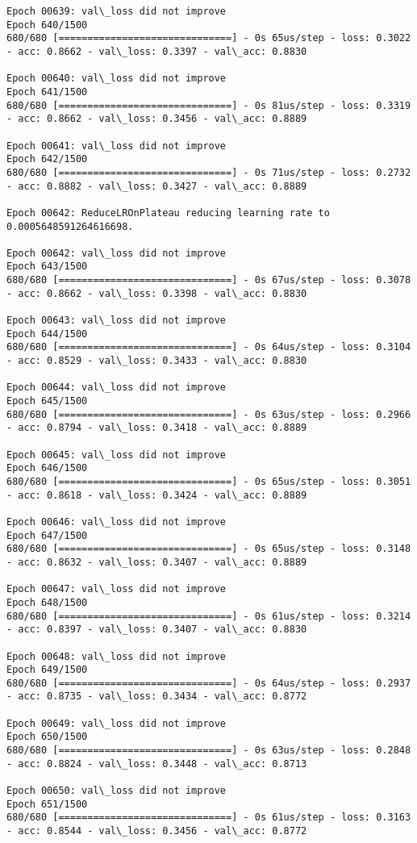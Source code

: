 \documentclass[11pt]{article}
\begin{document}
\begin{Verbatim}[commandchars=\\\{\}]
Epoch 00639: val\_loss did not improve
Epoch 640/1500
680/680 [==============================] - 0s 65us/step - loss: 0.3022 - acc: 0.8662 - val\_loss: 0.3397 - val\_acc: 0.8830

Epoch 00640: val\_loss did not improve
Epoch 641/1500
680/680 [==============================] - 0s 81us/step - loss: 0.3319 - acc: 0.8662 - val\_loss: 0.3456 - val\_acc: 0.8889

Epoch 00641: val\_loss did not improve
Epoch 642/1500
680/680 [==============================] - 0s 71us/step - loss: 0.2732 - acc: 0.8882 - val\_loss: 0.3427 - val\_acc: 0.8889

Epoch 00642: ReduceLROnPlateau reducing learning rate to 0.0005648591264616698.

Epoch 00642: val\_loss did not improve
Epoch 643/1500
680/680 [==============================] - 0s 67us/step - loss: 0.3078 - acc: 0.8662 - val\_loss: 0.3398 - val\_acc: 0.8830

Epoch 00643: val\_loss did not improve
Epoch 644/1500
680/680 [==============================] - 0s 64us/step - loss: 0.3104 - acc: 0.8529 - val\_loss: 0.3433 - val\_acc: 0.8830

Epoch 00644: val\_loss did not improve
Epoch 645/1500
680/680 [==============================] - 0s 63us/step - loss: 0.2966 - acc: 0.8794 - val\_loss: 0.3418 - val\_acc: 0.8889

Epoch 00645: val\_loss did not improve
Epoch 646/1500
680/680 [==============================] - 0s 65us/step - loss: 0.3051 - acc: 0.8618 - val\_loss: 0.3424 - val\_acc: 0.8889

Epoch 00646: val\_loss did not improve
Epoch 647/1500
680/680 [==============================] - 0s 65us/step - loss: 0.3148 - acc: 0.8632 - val\_loss: 0.3407 - val\_acc: 0.8889

Epoch 00647: val\_loss did not improve
Epoch 648/1500
680/680 [==============================] - 0s 61us/step - loss: 0.3214 - acc: 0.8397 - val\_loss: 0.3407 - val\_acc: 0.8830

Epoch 00648: val\_loss did not improve
Epoch 649/1500
680/680 [==============================] - 0s 64us/step - loss: 0.2937 - acc: 0.8735 - val\_loss: 0.3434 - val\_acc: 0.8772

Epoch 00649: val\_loss did not improve
Epoch 650/1500
680/680 [==============================] - 0s 63us/step - loss: 0.2848 - acc: 0.8824 - val\_loss: 0.3448 - val\_acc: 0.8713

Epoch 00650: val\_loss did not improve
Epoch 651/1500
680/680 [==============================] - 0s 61us/step - loss: 0.3163 - acc: 0.8544 - val\_loss: 0.3456 - val\_acc: 0.8772


\end{Verbatim}
\end{document}

